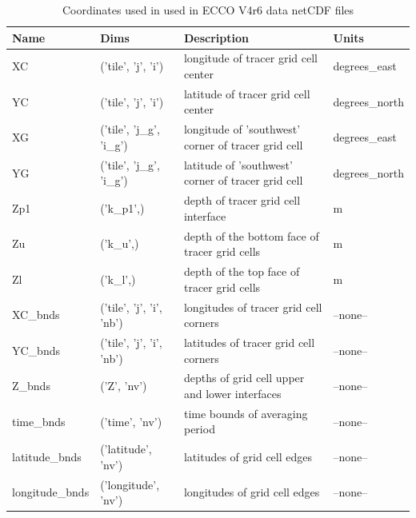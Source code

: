 \begin{longtable}{|p{}|p{}|p{}|p{}|}
\caption{Coordinates used in used in ECCO V4r6 data netCDF files}
\label{tab:variable-attributes} \\ 
\hline \endfirsthead
\endhead
\endfoot
\hline \endlastfoot
\rowcolor{blue!25} \textbf{Name} & \textbf{Dims} & \textbf{Description} & \textbf{Units} \\ \hline
\rowcolor{magenta!25}
XC & ('tile', 'j', 'i') & longitude of tracer grid cell center & degrees\_east \\ \hline
\rowcolor{magenta!25}
YC & ('tile', 'j', 'i') & latitude of tracer grid cell center & degrees\_north \\ \hline
\rowcolor{magenta!25}
XG & ('tile', 'j\_g', 'i\_g') & longitude of 'southwest' corner of tracer grid cell & degrees\_east \\ \hline
\rowcolor{magenta!25}
YG & ('tile', 'j\_g', 'i\_g') & latitude of 'southwest' corner of tracer grid cell & degrees\_north \\ \hline
\rowcolor{magenta!25}
Zp1 & ('k\_p1',) & depth of tracer grid cell interface & m \\ \hline
\rowcolor{magenta!25}
Zu & ('k\_u',) & depth of the bottom face of tracer grid cells & m \\ \hline
\rowcolor{magenta!25}
Zl & ('k\_l',) & depth of the top face of tracer grid cells & m \\ \hline
\rowcolor{magenta!25}
XC\_bnds & ('tile', 'j', 'i', 'nb') & longitudes of tracer grid cell corners & --none-- \\ \hline
\rowcolor{magenta!25}
YC\_bnds & ('tile', 'j', 'i', 'nb') & latitudes of tracer grid cell corners & --none-- \\ \hline
\rowcolor{magenta!25}
Z\_bnds & ('Z', 'nv') & depths of grid cell upper and lower interfaces & --none-- \\ \hline
\rowcolor{magenta!25}
time\_bnds & ('time', 'nv') & time bounds of averaging period & --none-- \\ \hline
\rowcolor{magenta!25}
latitude\_bnds & ('latitude', 'nv') & latitudes of grid cell edges & --none-- \\ \hline
\rowcolor{magenta!25}
longitude\_bnds & ('longitude', 'nv') & longitudes of grid cell edges & --none-- \\ \hline
\end{longtable}
